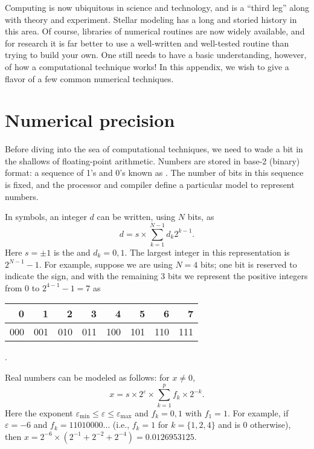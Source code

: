 
Computing is now ubiquitous in science and technology, and is a ``third leg'' along with theory and experiment. Stellar modeling has a long and storied history in this area. Of course, libraries of numerical routines are now widely available, and for research it is far better to use a well-written and well-tested routine than trying to build your own. One still needs to have a basic understanding, however, of how a computational technique works! In this appendix, we wish to give a flavor of a few common numerical techniques. 

\section{Numerical precision}\label{s.numerical-precision}
Before diving into the sea of computational techniques, we need to wade a bit in the shallows of floating-point arithmetic. Numbers are stored in base-2 (binary) format: a sequence of 1's and 0's known as . The number of bits in this sequence is fixed, and the processor and compiler define a particular model to represent numbers.

In symbols, an integer $d$ can be written, using $N$ bits, as
\[
d = s\times\sum_{k=1}^{N-1} d_{k}2^{k-1}.
\]
Here $s=\pm1$ is the  and $d_{k} = 0,1$. The largest integer in this representation is $2^{N-1}-1$. For example, suppose we are using $N=4$ bits; one bit is reserved to indicate the sign, and with the remaining 3 bits we represent the positive integers from $0$ to $2^{4-1}-1 = 7$ as
\begin{tabular}{rrrrrrrr}
0 & 1 & 2 & 3 & 4 & 5 & 6 & 7\\
\hline
000 & 001 & 010 & 011 & 100 & 101 & 110 & 111
\end{tabular}.

Real numbers can be modeled
as follows: for $x \neq 0$, 
\begin{equation}\label{e.modal-reals}
x = s\times 2^{\varepsilon}\times \sum_{k=1}^{p} f_{k}\times 2^{-k}.
\end{equation}
Here the exponent $\varepsilon_{\min}\le\varepsilon\le\varepsilon_{\max}$ and $f_{k}=0,1$ with $f_{1} = 1$. For example, if $\varepsilon=-6$ and $f_{k} = 11010000\ldots$ (i.e., $f_{k}=1$ for $k=\{1,2,4\}$ and is 0 otherwise), then
$x = 2^{-6}\times (2^{-1}+2^{-2}+2^{-4}) = 0.0126953125$.

